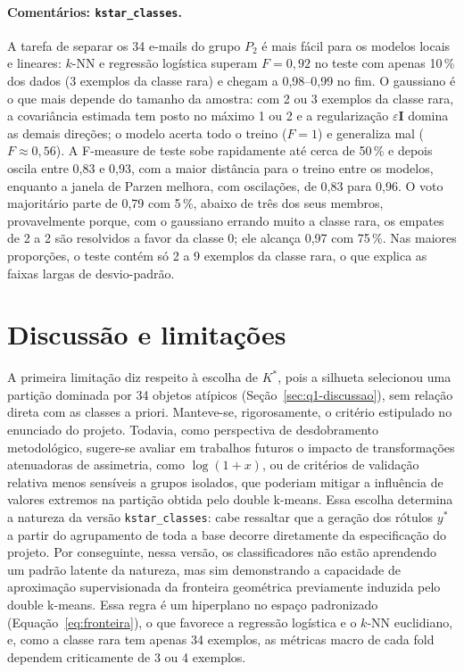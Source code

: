 \documentclass[11pt,a4paper]{article}
\begin{document}
\paragraph{Comentários: \texttt{kstar\_classes}.} A tarefa de separar os 34 e-mails do grupo $P_2$ é mais fácil
para os modelos locais e lineares: $k$-NN e regressão logística superam $F=0{,}92$ no teste com apenas 10\,\% dos
dados (3 exemplos da classe rara) e chegam a 0,98--0,99 no fim. O gaussiano é o que mais depende do tamanho da
amostra: com 2 ou 3 exemplos da classe rara, a covariância estimada tem posto no máximo 1 ou 2 e a regularização
$\varepsilon\mathbf{I}$ domina as demais direções; o modelo acerta todo o treino ($F=1$) e generaliza mal
($F\approx0{,}56$). A F-measure de teste sobe rapidamente até cerca de 50\,\% e depois oscila entre 0,83 e
0,93, com a maior distância para o treino entre os modelos, enquanto a janela de Parzen melhora, com oscilações, de
0,83 para 0,96. O voto majoritário parte de 0,79 com 5\,\%, abaixo de três dos seus membros, provavelmente porque, com
o gaussiano errando muito a classe rara, os empates de 2 a 2 são resolvidos a favor da classe 0; ele alcança 0,97
com 75\,\%. Nas maiores proporções, o teste contém só 2 a 9 exemplos da classe rara, o que explica as faixas largas de
desvio-padrão.

\section{Discussão e limitações}\label{sec:discussao}

A primeira limitação diz respeito à escolha de $K^*$, pois a silhueta selecionou uma partição dominada por 34 objetos atípicos
(Seção~\ref{sec:q1-discussao}), sem relação direta com as classes a priori. Manteve-se, rigorosamente, o critério estipulado no enunciado do projeto. 
Todavia, como perspectiva de desdobramento metodológico, sugere-se avaliar em trabalhos futuros o impacto de transformações atenuadoras de assimetria, 
como $\log(1+x)$, ou de critérios de validação relativa menos sensíveis a grupos isolados, que poderiam mitigar a influência de valores extremos na 
partição obtida pelo double k-means. Essa escolha determina a natureza da versão \texttt{kstar\_classes}: cabe ressaltar que a geração dos rótulos $y^*$ 
a partir do agrupamento de toda a base decorre diretamente da especificação do projeto. Por conseguinte, nessa versão, os classificadores não estão 
aprendendo um padrão latente da natureza, mas sim demonstrando a capacidade de aproximação supervisionada da fronteira geométrica previamente induzida 
pelo double k-means. Essa regra é um hiperplano no espaço padronizado (Equação~\ref{eq:fronteira}), o que favorece a regressão logística e o $k$-NN 
euclidiano, e, como a classe rara tem apenas 34 exemplos, as métricas macro de cada fold dependem criticamente de 3 ou 4 exemplos.
\end{document}
